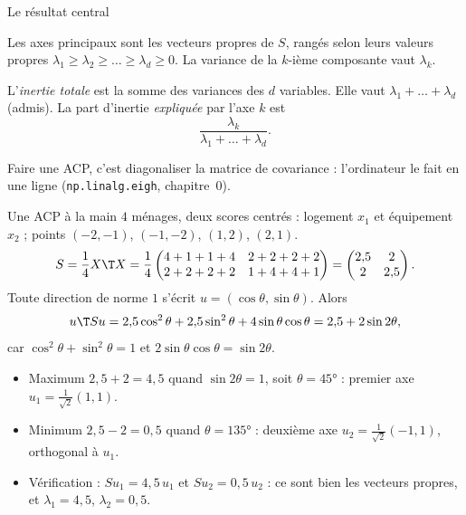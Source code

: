 \documentclass[aspectratio=169,11pt]{beamer}
\begin{document}
\begin{frame}{Le résultat central}
  \begin{theoreme}
    Les axes principaux sont les vecteurs propres de $S$, rangés selon leurs valeurs propres $\lambda_1\ge\lambda_2\ge\dots\ge\lambda_d\ge0$.
    La variance de la $k$-ième composante vaut $\lambda_k$.
  \end{theoreme}
  \begin{definition}[Inertie]
    L'\emph{inertie totale} est la somme des variances des $d$ variables. Elle vaut $\lambda_1+\dots+\lambda_d$ (admis). La part d'inertie \emph{expliquée} par l'axe $k$ est
    \[
      \frac{\lambda_k}{\lambda_1+\dots+\lambda_d}.
    \]
  \end{definition}
  \begin{aretenir}
    Faire une ACP, c'est diagonaliser la matrice de covariance : l'ordinateur le fait en une ligne (\texttt{np.linalg.eigh}, chapitre~0).
  \end{aretenir}
\end{frame}

\begin{frame}{Une ACP à la main}
  \small
  $4$ ménages, deux scores centrés : logement $x_1$ et équipement $x_2$ ; points $(-2,-1)$, $(-1,-2)$, $(1,2)$, $(2,1)$.
  \[
    S=\frac14X\T X=\frac14\begin{pmatrix}4+1+1+4&2+2+2+2\\2+2+2+2&1+4+4+1\end{pmatrix}=\begin{pmatrix}2{,}5&2\\2&2{,}5\end{pmatrix}.
  \]
  Toute direction de norme $1$ s'écrit $u=(\cos\theta,\sin\theta)$. Alors
  \[
    u\T Su=2{,}5\cos^2\theta+2{,}5\sin^2\theta+4\sin\theta\cos\theta=2{,}5+2\sin2\theta ,
  \]
  car $\cos^2\theta+\sin^2\theta=1$ et $2\sin\theta\cos\theta=\sin2\theta$.
  \begin{itemize}
    \item Maximum $2{,}5+2=4{,}5$ quand $\sin2\theta=1$, soit $\theta=45°$ : premier axe $u_1=\frac1{\sqrt2}(1,1)$.
    \item Minimum $2{,}5-2=0{,}5$ quand $\theta=135°$ : deuxième axe $u_2=\frac1{\sqrt2}(-1,1)$, orthogonal à $u_1$.
    \item Vérification : $Su_1=4{,}5\,u_1$ et $Su_2=0{,}5\,u_2$ : ce sont bien les vecteurs propres, et $\lambda_1=4{,}5$, $\lambda_2=0{,}5$.
  \end{itemize}
\end{frame}
\end{document}
